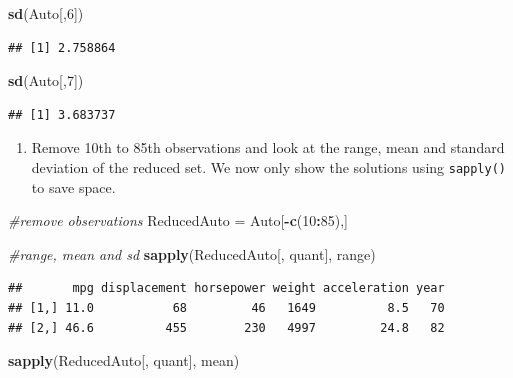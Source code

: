 \documentclass[]{article}
\newenvironment{Shaded}{\begin{snugshade}}{\end{snugshade}}
\newcommand{\KeywordTok}[1]{\textcolor[rgb]{0.13,0.29,0.53}{\textbf{#1}}}
\newcommand{\DecValTok}[1]{\textcolor[rgb]{0.00,0.00,0.81}{#1}}
\newcommand{\StringTok}[1]{\textcolor[rgb]{0.31,0.60,0.02}{#1}}
\newcommand{\CommentTok}[1]{\textcolor[rgb]{0.56,0.35,0.01}{\textit{#1}}}
\newcommand{\OperatorTok}[1]{\textcolor[rgb]{0.81,0.36,0.00}{\textbf{#1}}}
\newcommand{\NormalTok}[1]{#1}
\providecommand{\tightlist}{%
  \setlength{\itemsep}{0pt}\setlength{\parskip}{0pt}}
\begin{document}
\begin{Shaded}
\begin{Highlighting}[]
\KeywordTok{sd}\NormalTok{(Auto[,}\DecValTok{6}\NormalTok{])}
\end{Highlighting}
\end{Shaded}

\begin{verbatim}
## [1] 2.758864
\end{verbatim}

\begin{Shaded}
\begin{Highlighting}[]
\KeywordTok{sd}\NormalTok{(Auto[,}\DecValTok{7}\NormalTok{])}
\end{Highlighting}
\end{Shaded}

\begin{verbatim}
## [1] 3.683737
\end{verbatim}

\begin{enumerate}
\def\labelenumi{\alph{enumi})}
\setcounter{enumi}{3}
\tightlist
\item
  Remove 10th to 85th observations and look at the range, mean and
  standard deviation of the reduced set. We now only show the solutions
  using \texttt{sapply()} to save space.
\end{enumerate}

\begin{Shaded}
\begin{Highlighting}[]
\CommentTok{#remove observations}
\NormalTok{ReducedAuto =}\StringTok{ }\NormalTok{Auto[}\OperatorTok{-}\KeywordTok{c}\NormalTok{(}\DecValTok{10}\OperatorTok{:}\DecValTok{85}\NormalTok{),]}

\CommentTok{#range, mean and sd}
\KeywordTok{sapply}\NormalTok{(ReducedAuto[, quant], range)}
\end{Highlighting}
\end{Shaded}

\begin{verbatim}
##       mpg displacement horsepower weight acceleration year
## [1,] 11.0           68         46   1649          8.5   70
## [2,] 46.6          455        230   4997         24.8   82
\end{verbatim}

\begin{Shaded}
\begin{Highlighting}[]
\KeywordTok{sapply}\NormalTok{(ReducedAuto[, quant], mean)}
\end{Highlighting}
\end{Shaded}
\end{document}
